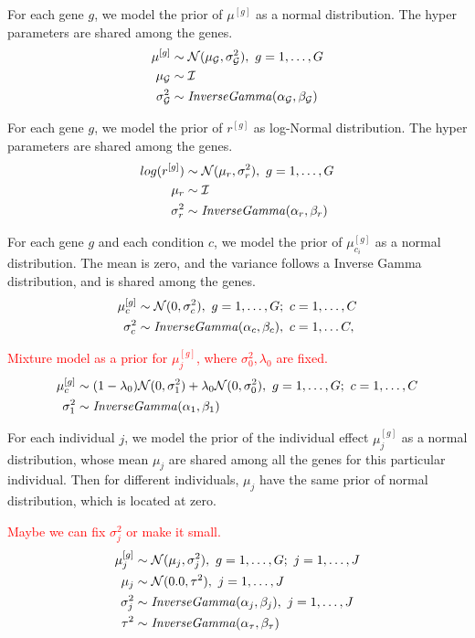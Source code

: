\documentclass[fleqn,10pt]{wlscirep}
\def\mywarn#1{\textcolor{red}{#1}}
\newcommand{\mymucond}{\mu_{c_i}}
\begin{document}
For each gene \(g\), we model the prior of \(\mu^{[g]}\) as a normal distribution. The hyper
parameters are shared among the genes.
\begin{align*}
  \mu^{[g]} &\sim \mathcal{N}(\mu_{\mathcal{G}}, \sigma^2_{\mathcal{G}}),~g=1,\dots,G\\
  \mu_{\mathcal{G}} &\sim \mathcal{I} \\
  \sigma^2_{\mathcal{G}} &\sim {\it Inverse Gamma} (\alpha_{\mathcal{G}}, \beta_{\mathcal{G}})
\end{align*}

For each gene \(g\), we model the prior of \(r^{[g]}\) as log-Normal distribution. The
hyper parameters are shared among the genes.
\begin{align*}
  log(r^{[g]}) &\sim \mathcal{N}(\mu_r, \sigma_r^2),~g=1,\dots,G\\
  \mu_r &\sim \mathcal{I} \\
  \sigma_r^2 &\sim {\it Inverse Gamma}(\alpha_r, \beta_r)
\end{align*}

For each gene \(g\) and each condition \(c\), we model the prior of \(\mymucond^{[g]}\) as a normal
distribution. The mean is zero, and the variance follows a Inverse Gamma
distribution, and is shared among the genes.
\begin{align*}
  \mu_{c}^{[g]} &\sim \mathcal{N}(0, \sigma^2_{c}),~ g=1,\dots,G;~c=1,\dots,C\\
  \sigma_c^2 &\sim {\it Inverse Gamma}(\alpha_c, \beta_c),~c=1,\dots C,
\end{align*}

\mywarn{Mixture model as a prior for $\mu_{j}^{[g]}$, where $\sigma_0^2, \lambda_0$ are fixed.
\begin{align*}
  \mu_{c}^{[g]} &\sim (1 - \lambda_0)\mathcal{N}(0, \sigma^2_{1}) + \lambda_0 \mathcal{N}(0, \sigma^2_{0}),~ g=1,\dots,G;~c=1,\dots,C\\
  \sigma_1^2 &\sim {\it Inverse Gamma}(\alpha_1, \beta_1)
\end{align*}
}

For each individual \(j\), we model the prior of the individual effect
\(\mu_j^{[g]}\) as a normal distribution, whose mean \(\mu_j\) are shared among all the genes
for this particular individual. Then for different individuals, \(\mu_j\) have
the same prior of normal distribution, which is located at zero.

\mywarn{Maybe we can fix $\sigma_j^2$ or make it small.}
\begin{align*}
  \mu_j^{[g]} &\sim \mathcal{N}(\mu_j, \sigma_j^2),~g=1,\dots, G;~j=1,\dots, J \\
  \mu_j &\sim \mathcal{N}(0.0, \tau^2),~j=1,\dots,J\\
  \sigma_j^2 &\sim {\it Inverse Gamma}(\alpha_j, \beta_j),~j=1,\dots,J \\
  \tau^2 &\sim {\it Inverse Gamma}(\alpha_\tau, \beta_\tau)
\end{align*}
\end{document}
